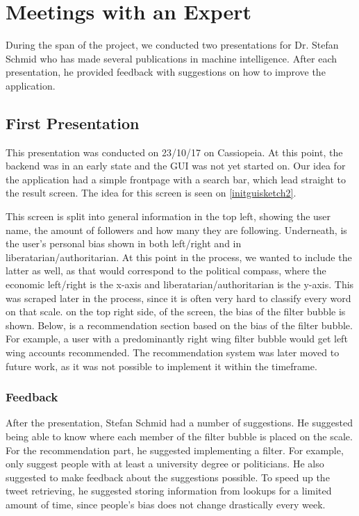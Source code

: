 \section{Meetings with an Expert} \label{expMeeting}
During the span of the project, we conducted two presentations for Dr. Stefan
Schmid who has made several publications in machine intelligence. After
each presentation, he provided feedback with suggestions on how to improve
the application.
 
\subsection{First Presentation}
This presentation was conducted on 23/10/17 on Cassiopeia. At this point, the
backend was in an early state and the \ac{GUI} was not yet started on. Our idea
for the application had a simple frontpage with a search bar, which lead
straight to the result screen. The idea for this screen is seen on
\autoref{initguisketch2}.\nl


This screen is split into general information in the top left, showing the user
name, the amount of followers and how many they are following. Underneath, is
the user's personal bias shown in both left/right and in
liberatarian/authoritarian. At this point in the process, we wanted to include
the latter as well, as that would correspond to the political compass, where the
economic left/right is the x-axis and liberatarian/authoritarian is the y-axis.
This was scraped later in the process, since it is often very hard to classify
every word on that scale. on the top right side, of the screen, the bias of the
filter bubble is shown. Below, is a recommendation section based on the bias of
the filter bubble. For example, a user with a predominantly right wing
filter bubble would get left wing accounts recommended. The recommendation
system was later moved to future work, as it was not possible to implement it within
the timeframe. 

\subsubsection{Feedback}
After the presentation, Stefan Schmid had a number of suggestions. He suggested
being able to know where each member of the filter bubble is placed on the
scale. For the recommendation part, he suggested implementing a filter. For
example, only suggest people with at least a university degree or politicians. 
He also suggested to make feedback about the suggestions possible.
To speed up the tweet retrieving, he suggested storing information from lookups
for a limited amount of time, since people's bias does not change drastically
every week. 

